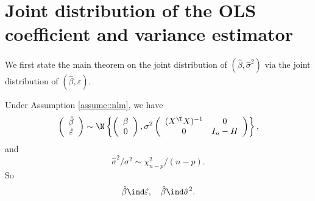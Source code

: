 \section{Joint distribution of the OLS coefficient and variance estimator}

We first state the main theorem on the joint distribution of $(\hat{\beta},\hat{\sigma}^{2})$
via the joint distribution of $(\hat{\beta},\hat{\varepsilon}).$
\begin{theorem}
\label{thm:normalexactdistribution}Under Assumption \ref{assume::nlm}, we have 
\[
\left(\begin{array}{c}
\hat{\beta}\\
\hat{\varepsilon}
\end{array}\right)\sim\N\left\{ \left(\begin{array}{c}
\beta\\
0
\end{array}\right),\sigma^{2}\left(\begin{array}{cc}
(X^{\T}X)^{-1} & 0\\
0 & I_{n}-H
\end{array}\right)\right\} ,
\]
and
$$
\hat{\sigma}^{2}/\sigma^{2}\sim\chi_{n-p}^{2}/(n-p).
$$
So 
$$
\hat{\beta}\ind\hat{\varepsilon} ,\quad 
 \hat{\beta}\ind\hat{\sigma}^{2}  .
$$
\end{theorem}
 
